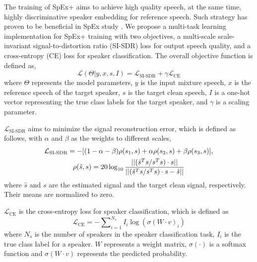 \documentclass[a4paper]{article}
\begin{document}
The training of SpEx+ aims to achieve high quality speech, at the same time, highly discriminative speaker embedding for reference speech. Such strategy has proven to be beneficial in SpEx study \cite{spex2020}. We propose a multi-task learning implementation for SpEx+ training with two objectives, a multi-scale scale-invariant signal-to-distortion ratio (SI-SDR) loss for output speech quality, and a cross-entropy (CE) loss for speaker classification. The overall objective function is defined as,
\begin{equation}
\mathcal{L}(\Theta | y, x, s, I) = \mathcal{L}_{\text{SI-SDR}} + \gamma \mathcal{L}_{\text{CE}}
\label{eq2-1-4}
\end{equation}
where $\Theta$ represents the model parameters, $y$ is the input mixture speech, $x$ is the reference speech of the target speaker, $s$ is the target clean speech, $I$ is a one-hot vector representing the true class labels for the target speaker, and $\gamma$ is a scaling parameter.

$\mathcal{L}_{\text{SI-SDR}}$ aims to minimize the signal reconstruction error, which is defined as follows, with $\alpha$ and $\beta$ as the weights to different scales,
\begin{gather}
\mathcal{L}_{\text{SI-SDR}} = -[(1-\alpha-\beta)\rho(s_1, s) + \alpha \rho(s_2, s) + \beta \rho(s_3, s)], \notag\\
\rho(\hat{s}, s) = 20 \log_{10}\frac{||(\hat{s}^T s / s^T s) \cdot s||}{||(\hat{s}^T s / s^T s) \cdot s - \hat{s}||}
\label{eq2-1-5}
\end{gather}
where $\hat{s}$ and $s$ are the estimated signal and the target clean signal, respectively. Their means are normalized to zero. 

$\mathcal{L}_{\text{CE}}$ is the cross-entropy loss for speaker classification, which is defined as
\begin{equation}
\mathcal{L}_{\text{CE}} = -\sum\nolimits_{i=1}^{N_s} I_i \log(\sigma(W \cdot v)_i)
\end{equation}
where $N_s$ is the number of speakers in the speaker classification task, $I_i$ is the true class label for a speaker. $W$ represents a weight matrix, $\sigma(\cdot)$ is a softmax function and $\sigma(W \cdot v)$ represents the predicted probability.
\end{document}
